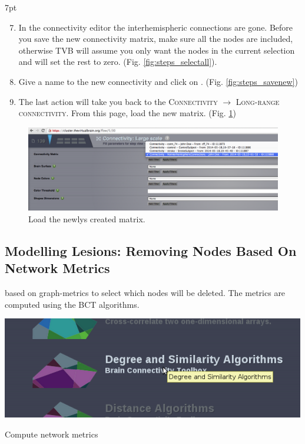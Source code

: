 \documentclass{tufte-handout}
\newenvironment{formal}{%
  \def\FrameCommand{%
    \hspace{1pt}%
    {\color{DarkBlue}\vrule width 2pt}%
    {\color{formalshade}\vrule width 4pt}%
    \colorbox{formalshade}%
  }%
  \MakeFramed{\advance\hsize-\width\FrameRestore}%
  \noindent\hspace{-4.55pt}%
  \begin{adjustwidth}{}{7pt}%
  \vspace{2pt}\vspace{2pt}%
}
{%
  \vspace{2pt}\end{adjustwidth}\endMakeFramed%
}
\begin{document}
\begin{formal}
  \begin{enumerate}[resume]
  \setcounter{enumi}{6}
    \item In the connectivity editor the interhemispheric connections are gone.
    Before you save the new connectivity matrix, make sure all the nodes are
included, otherwise TVB will assume you only want the nodes in the current
selection and will set the rest to zero. (Fig. \ref{fig:steps_selectall}).
   \item Give a name to the new connectivity and click on . (Fig. \ref{fig:steps_savenew})
    \item The last action will take you back to the \textsc{Connectivity} $\rightarrow$ \textsc{Long-range connectivity}. From this page, load the new matrix. (Fig. \ref{fig:steps_07})
  \end{enumerate}
\end{formal}


\begin{figure}[h]
  \includegraphics[width=\linewidth]{Handout_UI_ModellingStructuralLesions_LoadNewMatrix}%
  \caption{Load the newlys created matrix.}%
  \label{fig:steps_07}%
\end{figure}

\subsection{Modelling Lesions: Removing Nodes Based On Network Metrics}\label{sec:steps}

 based on graph-metrics to select which
nodes will be deleted. The metrics are computed using the BCT  algorithms.  


\begin{marginfigure}
  \includegraphics[width=\linewidth]{Handout_UI_ModellingStructuralLesions_Analysis}%
  \caption{Compute network metrics}%
  \label{fig:degree_similarity}%
\end{marginfigure}
\end{document}
